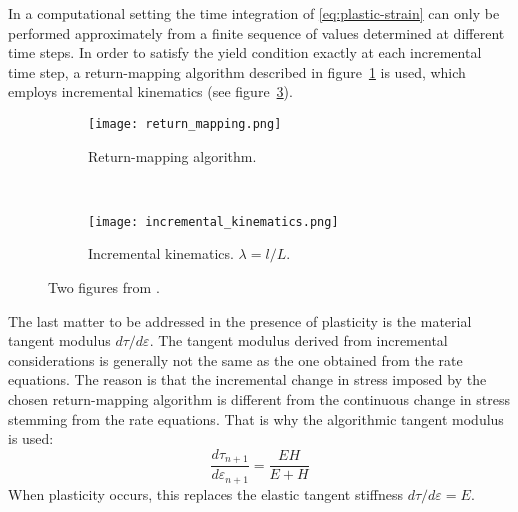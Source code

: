 In a computational setting the time integration of \eqref{eq:plastic-strain} can
only be performed approximately from a finite sequence of values determined at
different time steps.
In order to satisfy the yield condition exactly at each incremental time step,
a return-mapping algorithm described in figure~\ref{fig:return-mapping} is used,
which employs incremental kinematics (see figure~\ref{fig:incr-kinematics}).
\begin{figure}[th]
  \begin{subfigure}[t]{0.38\textwidth}
    \centering
    \texttt{[image: return\_mapping.png]}
    \caption{Return-mapping algorithm.}
    \label{fig:return-mapping}
  \end{subfigure}
  ~
  \begin{subfigure}[t]{0.56\textwidth}
    \centering
    \texttt{[image: incremental\_kinematics.png]}
    \caption{Incremental kinematics. \(\lambda = l / L\).}
    \label{fig:incr-kinematics}
  \end{subfigure}
  \caption{Two figures from \cite{Bonet2008}.}
\end{figure}

The last matter to be addressed in the presence of plasticity is the material
tangent modulus \(d \tau / d \varepsilon\).
The tangent modulus derived from incremental considerations is generally not
the same as the one obtained from the rate equations.
The reason is that the incremental change in stress imposed by the chosen
return-mapping algorithm is different from the continuous change in stress
stemming from the rate equations.
That is why the algorithmic tangent modulus is used:
\begin{equation}
  \frac{d \tau_{n+1}}{d \varepsilon_{n+1}} = \frac{E H}{E + H}
\end{equation}
When plasticity occurs, this replaces the elastic tangent stiffness
\(d \tau / d \varepsilon = E \).

